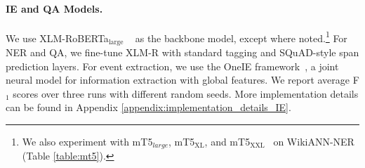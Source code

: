 \documentclass[11pt,dvipsnames]{article}
\begin{document}
\renewcommand{\arraystretch}{1.25}
\begin{table}[t!]
\centering
\small
{}
\vspace{-5pt}
\caption{The detailed statistics of train/dev/test sets for each dataset.  \textbf{Avg. Length} represents the average number of tokens in each article/sentence, and \textbf{Avg.  \# of Spans} denotes the average number of annotated spans in each sentence (in each article for TyDiQA).} 
\vspace{-15pt}
\label{table:stat}
\end{table}







\paragraph{IE and QA Models.} We use  XLM-RoBERTa$_\text{large}$ ~\citep{conneau2019xlmr} as the backbone  model, except where noted.\footnote{We also experiment with mT5$_{large}$, mT5$_{\text{XL}}$, and mT5$_{\text{XXL}}$~\citep{xue2021mt5} on WikiANN-NER (Table \ref{table:mt5}). }
For NER and QA, we fine-tune XLM-R with standard tagging and SQuAD-style span prediction layers. For event extraction, we use the OneIE framework~\citep{lin2020oneie}, a joint neural model for information extraction with global features. We report average F$_1$ scores over three runs with different random seeds. More implementation details can be found in Appendix \ref{appendix:implementation_details_IE}.
\end{document}
